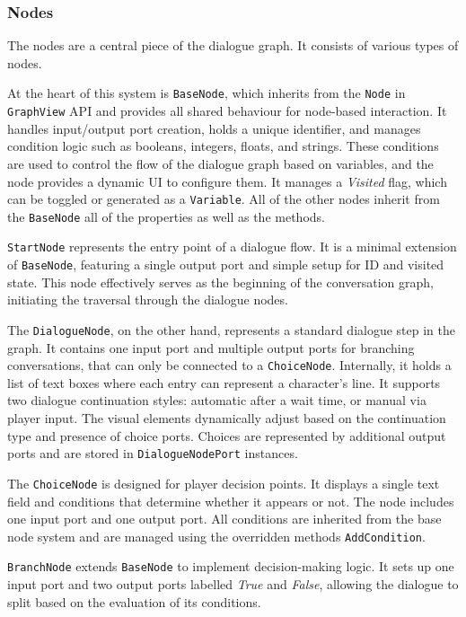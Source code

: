 \subsubsection{Nodes}
The nodes are a central piece of the dialogue graph. It consists of various types of nodes.

At the heart of this system is \verb|BaseNode|, which inherits from the \verb|Node| in \verb|GraphView| API and provides all shared behaviour for node-based interaction. It handles input/output port creation, holds a unique identifier, and manages condition logic such as booleans, integers, floats, and strings. These conditions are used to control the flow of the dialogue graph based on variables, and the node provides a dynamic UI to configure them. It manages a \textit{Visited} flag, which can be toggled or generated as a \verb|Variable|. All of the other nodes inherit from the \verb|BaseNode| all of the properties as well as the methods.

\verb|StartNode| represents the entry point of a dialogue flow. It is a minimal extension of \verb|BaseNode|, featuring a single output port and simple setup for ID and visited state. This node effectively serves as the beginning of the conversation graph, initiating the traversal through the dialogue nodes.

 The \verb|DialogueNode|, on the other hand, represents a standard dialogue step in the graph. It contains one input port and multiple output ports for branching conversations, that can only be connected to a \verb|ChoiceNode|. Internally, it holds a list of text boxes where each entry can represent a character's line. It supports two dialogue continuation styles: automatic after a wait time, or manual via player input. The visual elements dynamically adjust based on the continuation type and presence of choice ports. Choices are represented by additional output ports and are stored in \verb|DialogueNodePort| instances.

 The \verb|ChoiceNode| is designed for player decision points. It displays a single text field and conditions that determine whether it appears or not. The node includes one input port and one output port. All conditions are inherited from the base node system and are managed using the overridden methods \verb|AddCondition|.

\verb|BranchNode| extends \verb|BaseNode| to implement decision-making logic. It sets up one input port and two output ports labelled \textit{True} and \textit{False}, allowing the dialogue to split based on the evaluation of its conditions. 

